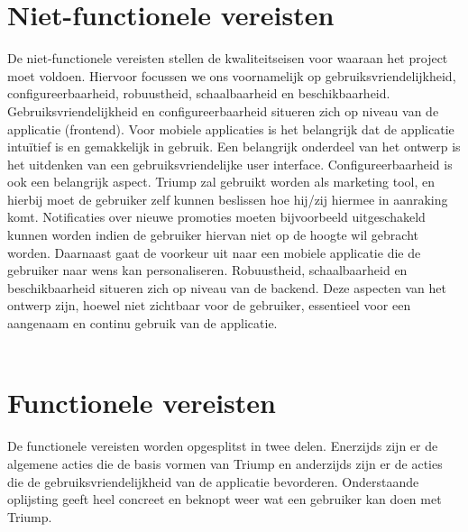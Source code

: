 \section{Niet-functionele vereisten}
De niet-functionele vereisten stellen de kwaliteitseisen voor waaraan het project moet voldoen. Hiervoor focussen we ons voornamelijk op gebruiksvriendelijkheid, configureerbaarheid, robuustheid, schaalbaarheid en beschikbaarheid.
Gebruiksvriendelijkheid en configureerbaarheid situeren zich op niveau van de applicatie (frontend). Voor mobiele applicaties is het belangrijk dat de applicatie intuïtief is en gemakkelijk in gebruik. Een belangrijk onderdeel van het ontwerp is het uitdenken van een gebruiksvriendelijke user interface. Configureerbaarheid is ook een belangrijk aspect. Triump zal gebruikt worden als marketing tool, en hierbij moet de gebruiker zelf kunnen beslissen hoe hij/zij hiermee in aanraking komt. Notificaties over nieuwe promoties moeten bijvoorbeeld uitgeschakeld kunnen worden indien de gebruiker hiervan niet op de hoogte wil gebracht worden. Daarnaast gaat de voorkeur uit naar een mobiele applicatie die de gebruiker naar wens kan personaliseren.
Robuustheid, schaalbaarheid en beschikbaarheid situeren zich op niveau van de backend. Deze aspecten van het ontwerp zijn, hoewel niet zichtbaar voor de gebruiker, essentieel voor een aangenaam en continu gebruik van de applicatie.
\\\\
\section{Functionele vereisten}
De functionele vereisten worden opgesplitst in twee delen. Enerzijds zijn er de algemene acties die de basis vormen van Triump en anderzijds zijn er de acties die de gebruiksvriendelijkheid van de applicatie bevorderen. Onderstaande oplijsting geeft heel concreet en beknopt weer wat een gebruiker kan doen met Triump.


